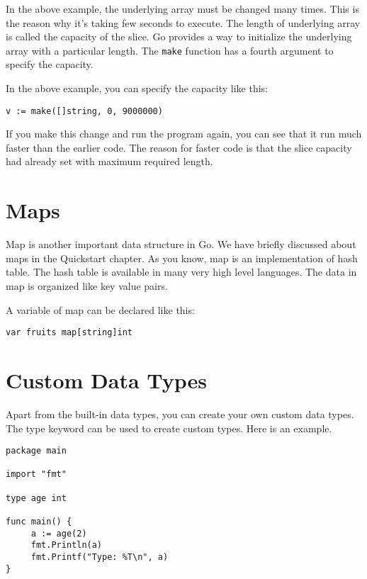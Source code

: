 In the above example, the underlying array must be changed many times.
This is the reason why it's taking few seconds to execute.  The length
of underlying array is called the capacity of the slice.  Go provides
a way to initialize the underlying array with a particular length.
The \texttt{make} function has a fourth argument to specify the
capacity.

In the above example, you can specify the capacity like this:

\begin{lstlisting}[numbers=none]
v := make([]string, 0, 9000000)
\end{lstlisting}

If you make this change and run the program again, you can see that it
run much faster than the earlier code.  The reason for faster code is
that the slice capacity had already set with maximum required length.

\section{Maps}

Map is another important data structure in Go.  We have
briefly discussed about maps in the Quickstart chapter.  As you know,
map is an implementation of hash table.  The hash table is available
in many very high level languages.  The data in map is organized like
key value pairs.

A variable of map can be declared like this:

\begin{lstlisting}[numbers=none]
var fruits map[string]int
\end{lstlisting}

\section{Custom Data Types}

Apart from the built-in data types, you can create your own custom
data types.  The type keyword
can be used to create custom types.  Here is an example.

\begin{lstlisting}[numbers=none]
package main

import "fmt"

type age int

func main() {
     a := age(2)
     fmt.Println(a)
     fmt.Printf("Type: %T\n", a)
}
\end{lstlisting}


